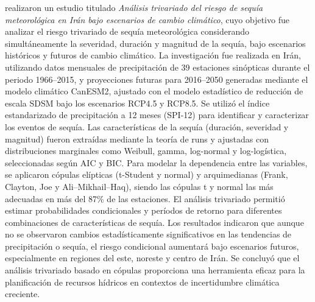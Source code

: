 \textcite{Bazrafshan2023} realizaron un estudio titulado \emph{Análisis trivariado del riesgo de sequía meteorológica en Irán bajo escenarios de cambio climático}, cuyo objetivo fue analizar el riesgo trivariado de sequía meteorológica considerando simultáneamente la severidad, duración y magnitud de la sequía, bajo escenarios históricos y futuros de cambio climático. La investigación fue realizada en Irán, utilizando datos mensuales de precipitación de 39 estaciones sinópticas durante el periodo 1966–2015, y proyecciones futuras para 2016–2050 generadas mediante el modelo climático CanESM2, ajustado con el modelo estadístico de reducción de escala SDSM bajo los escenarios RCP4.5 y RCP8.5. Se utilizó el índice estandarizado de precipitación a 12 meses (SPI-12) para identificar y caracterizar los eventos de sequía. Las características de la sequía (duración, severidad y magnitud) fueron extraídas mediante la teoría de runs y ajustadas con distribuciones marginales como Weibull, gamma, log-normal y log-logística, seleccionadas según AIC y BIC. Para modelar la dependencia entre las variables, se aplicaron cópulas elípticas (t-Student y normal) y arquimedianas (Frank, Clayton, Joe y Ali–Mikhail–Haq), siendo las cópulas t y normal las más adecuadas en más del 87\% de las estaciones. El análisis trivariado permitió estimar probabilidades condicionales y períodos de retorno para diferentes combinaciones de características de sequía. Los resultados indicaron que aunque no se observaron cambios estadísticamente significativos en las tendencias de precipitación o sequía, el riesgo condicional aumentará bajo escenarios futuros, especialmente en regiones del este, noreste y centro de Irán. Se concluyó que el análisis trivariado basado en cópulas proporciona una herramienta eficaz para la planificación de recursos hídricos en contextos de incertidumbre climática creciente.

